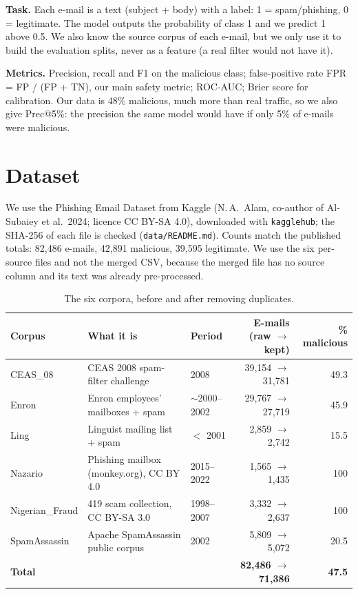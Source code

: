 \documentclass[11pt,a4paper]{article}
\begin{document}
\textbf{Task.} Each e-mail is a text (subject + body) with a label: 1 = spam/phishing, 0 = legitimate. The model outputs the probability of class 1 and we predict 1 above 0.5. We also know the source corpus of each e-mail, but we only use it to build the evaluation splits, never as a feature (a real filter would not have it).

\textbf{Metrics.} Precision, recall and F1 on the malicious class; false-positive rate FPR = FP / (FP + TN), our main safety metric; ROC-AUC; Brier score for calibration. Our data is 48\% malicious, much more than real traffic, so we also give Prec@5\%: the precision the same model would have if only 5\% of e-mails were malicious.

\section{Dataset}
We use the Phishing Email Dataset from Kaggle (N.\,A.~Alam, co-author of Al-Subaiey et al.\ 2024; licence CC BY-SA 4.0), downloaded with \texttt{kagglehub}; the SHA-256 of each file is checked (\texttt{data/README.md}). Counts match the published totals: 82,486 e-mails, 42,891 malicious, 39,595 legitimate. We use the six per-source files and not the merged CSV, because the merged file has no source column and its text was already pre-processed.

\begin{table}[H]\centering\small
\caption{The six corpora, before and after removing duplicates.}
\setlength{\tabcolsep}{4pt}
\begin{tabular}{lL{5cm}lrr}
\toprule
Corpus & What it is & Period & E-mails (raw $\rightarrow$ kept) & \% malicious \\
\midrule
CEAS\_08 & CEAS 2008 spam-filter challenge & 2008 & 39,154 $\rightarrow$ 31,781 & 49.3 \\
Enron & Enron employees' mailboxes + spam & $\sim$2000--2002 & 29,767 $\rightarrow$ 27,719 & 45.9 \\
Ling & Linguist mailing list + spam & $<$ 2001 & 2,859 $\rightarrow$ 2,742 & 15.5 \\
Nazario & Phishing mailbox (monkey.org), CC BY 4.0 & 2015--2022 & 1,565 $\rightarrow$ 1,435 & 100 \\
Nigerian\_Fraud & 419 scam collection, CC BY-SA 3.0 & 1998--2007 & 3,332 $\rightarrow$ 2,637 & 100 \\
SpamAssassin & Apache SpamAssassin public corpus & 2002 & 5,809 $\rightarrow$ 5,072 & 20.5 \\
\midrule
\textbf{Total} & & & \textbf{82,486 $\rightarrow$ 71,386} & \textbf{47.5} \\
\bottomrule
\end{tabular}
\end{table}
\end{document}
